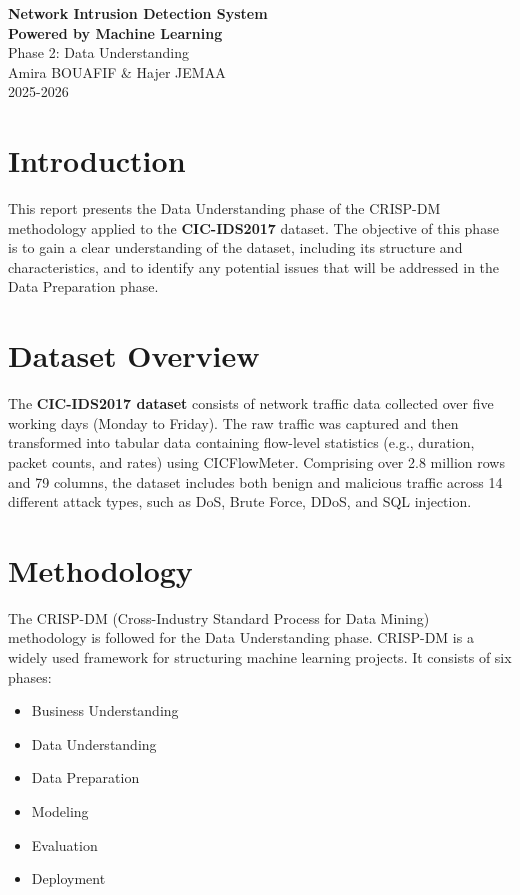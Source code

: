 \documentclass[12pt,a4paper]{article}
\begin{document}
\begin{titlepage}
    \centering
    \vspace*{6.5cm}
    {\LARGE \textbf{Network Intrusion Detection System} \\[0.5em]
        \textbf{Powered by Machine Learning}}\\[2cm]
    {\large Phase 2: Data Understanding }\\[2cm]
    {\large Amira BOUAFIF \& Hajer JEMAA}\\[0.5cm]
    \vfill
    {\large 2025-2026}\\[1cm]
\end{titlepage}

\section{Introduction}

This report presents the Data Understanding phase of the CRISP-DM methodology applied
to the \textbf{CIC-IDS2017} dataset. The objective of this phase is to gain a clear
understanding of the dataset, including its structure and characteristics, and to
identify any potential issues that will be addressed in the Data Preparation phase.

\section{Dataset Overview}

The \textbf{CIC-IDS2017 dataset} consists of network traffic data collected over five
working days (Monday to Friday). The raw traffic was captured and then transformed into
tabular data containing flow-level statistics (e.g., duration, packet counts, and rates)
using CICFlowMeter. Comprising over 2.8 million rows and 79 columns, the dataset
includes both benign and malicious traffic across 14 different attack types, such as
DoS, Brute Force, DDoS, and SQL injection.

\section{Methodology}

The CRISP-DM (Cross-Industry Standard Process for Data Mining) methodology is followed
for the Data Understanding phase. CRISP-DM is a widely used framework for structuring
machine learning projects. It consists of six phases:

\begin{itemize}
    \item Business Understanding
    \item Data Understanding
    \item Data Preparation
    \item Modeling
    \item Evaluation
    \item Deployment
\end{itemize}
\end{document}
